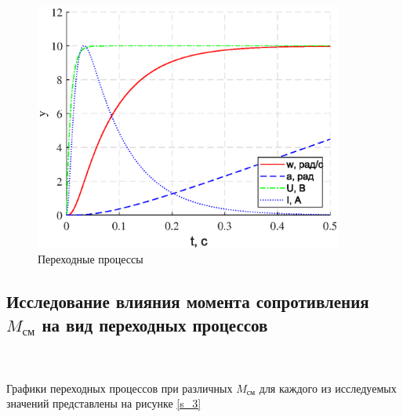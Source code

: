 \documentclass[a4paper,12pt]{article}
\begin{document}
		\begin{figure}[h!]
			\renewcommand{\figurename}{Рисунок}
			\centering
			\includegraphics[width=4in]{ph1.eps}
			\caption{Переходные процессы}
			\label{s_2}
		\end{figure}
	\newpage
	\subsection{Исследование влияния момента сопротивления $M_{\text{см}}$ на вид переходных процессов}~~\\
		\paragraph {} Графики переходных процессов при различных $M_{\text{см}}$ для каждого из исследуемых значений представлены на рисунке \ref{s_3}\\
		
\end{document}
